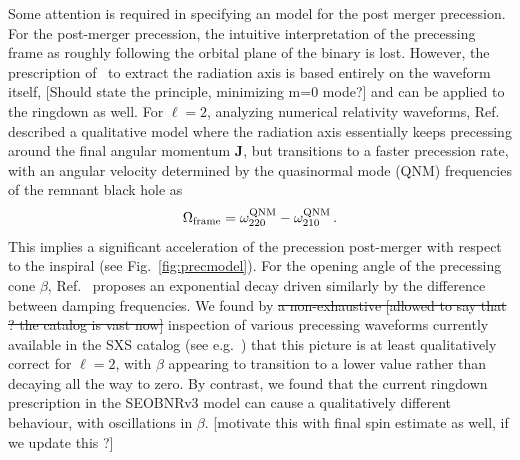 \documentclass[aps,showpacs,twocolumn,
prd,superscriptaddress,nofootinbib]{revtex4-1}
\newcommand{\be}{\begin{equation}}
\newcommand{\ee}{\end{equation}}
\newcommand{\SM}[1]{{\color{Red} #1}}
\newcommand{\jgb}[1]{{\color{DarkGreen} #1}}
\begin{document}
\jgb{Some attention is required in specifying an model for the post merger precession.}
For the post-merger precession, the intuitive interpretation of the precessing frame as roughly following the orbital plane of the binary is lost. However, the prescription of~\cite{OShaughnessy+11} to extract the radiation axis is based entirely on the waveform itself,\jgb{ [Should state the principle, minimizing m=0 mode?]} and can be applied to the ringdown as well. For $\ell=2$, analyzing numerical relativity waveforms, Ref.~\cite{OShaughnessy+12} described a qualitative model where the radiation axis essentially keeps precessing around the final angular momentum $\bm{J}$, but transitions to a faster precession rate, with an angular velocity determined by the quasinormal mode (QNM) frequencies of the remnant black hole as
\be\label{eq:OmegaframeQNM}
	\Omega_{\rm frame} = \omega_{220}^{\rm QNM} - \omega_{210}^{\rm QNM} \,.
\ee
This \jgb{implies} a significant acceleration of the precession post-merger with respect to the inspiral (see Fig.~\ref{fig:precmodel}). For the opening angle of the precessing cone $\beta$, Ref.~\cite{OShaughnessy+12} proposes an exponential decay driven similarly by the difference between damping frequencies. We found by \sout{a non-exhaustive \SM{[allowed to say that ? the catalog is vast now]}} inspection of \jgb{various} precessing waveforms currently available in the SXS catalog (see e.g.~\cite{SXScatalog, Mroue+12, Mroue+13}) that this picture is at least qualitatively correct for $\ell=2$, with $\beta$ appearing to transition to a lower value rather than decaying all the way to zero. By contrast, we found that the current ringdown prescription in the SEOBNRv3 model can cause a qualitatively different behaviour, with oscillations in $\beta$. \SM{[motivate this with final spin estimate as well, if we update this ?]}
\end{document}
